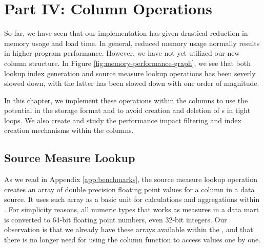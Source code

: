 \chapter{Part IV: Column Operations}
\label{chap:operations}

So far, we have seen that our implementation has given drastical reduction in memory usage and load time. In general, reduced memory usage normally results in higher program performance. However, we have not yet utilized our new column structure. In Figure \ref{fig:memory-performance-graph}, we see that both lookup index generation and source measure lookup operations has been severly slowed down, with the latter has been slowed down with one order of magnitude.

In this chapter, we implement these operations within the columns to use the potential in the storage format and to avoid creation and deletion of s in tight loops. We also create and study the performance impact filtering and index creation mechanisms within the columns.

\clearpage

\section{Source Measure Lookup}
\label{sec:Source Measure Lookup}
As we read in Appendix \ref{app:benchmarks}, the source measure lookup operation creates an array of double precision floating point values for a column in a data source. It uses such array as a basic unit for calculations and aggregations within \gd. For simplicity reasons, all numeric types that works as measures in a data mart is converted to 64-bit floating point numbers, even 32-bit integers. Our observation is that we already have these arrays available within the , and that there is no longer need for using the column  function to access values one by one.


